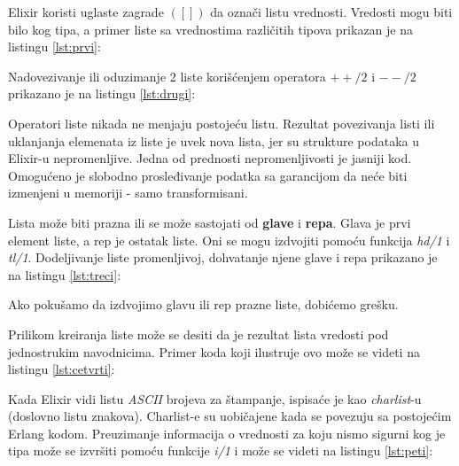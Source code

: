 \documentclass[12pt,oneside]{memoir}
\begin{document}
Elixir koristi uglaste zagrade $([])$ da označi listu vrednosti. Vredosti mogu biti bilo kog tipa, a primer liste sa vrednostima različitih tipova prikazan je na listingu \ref{lst:prvi}:



\newpage

Nadovezivanje ili oduzimanje 2 liste korišćenjem operatora $++/2$ i $--/2$ prikazano je na listingu \ref{lst:drugi}:



Operatori liste nikada ne menjaju postojeću listu. Rezultat povezivanja listi ili uklanjanja elemenata iz liste je uvek nova lista, jer su strukture podataka u Elixir-u nepromenljive. Jedna od prednosti nepromenljivosti je jasniji kod. Omogućeno je slobodno prosleđivanje podatka sa garancijom da neće biti izmenjeni u memoriji - samo transformisani.

Lista može biti prazna ili se može sastojati od \textbf{glave} i \textbf{repa}. Glava je prvi element liste, a rep je ostatak liste. Oni se mogu izdvojiti pomoću funkcija \textit{hd/1} i \textit{tl/1}. Dodeljivanje liste promenljivoj, dohvatanje njene glave i repa prikazano je na listingu \ref{lst:treci}:



Ako pokušamo da izdvojimo glavu ili rep prazne liste, dobićemo grešku.

Prilikom kreiranja liste može se desiti da je rezultat lista vredosti pod jednostrukim navodnicima. Primer koda koji ilustruje ovo može se videti na listingu \ref{lst:cetvrti}:



Kada Elixir vidi listu \textit{ASCII} brojeva za štampanje, ispisaće je kao \textit{charlist}-u (doslovno listu znakova). Charlist-e su uobičajene kada se povezuju sa postojećim Erlang kodom. Preuzimanje informacija o vrednosti za koju nismo sigurni kog je tipa može se izvršiti pomoću funkcije \textit{i/1} i može se videti na listingu \ref{lst:peti}:


\end{document}
